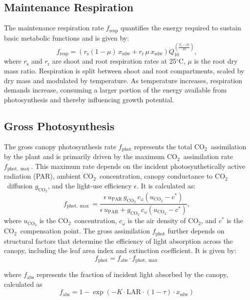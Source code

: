 \documentclass[conference]{IEEEtran}
\newcommand{\ui}[2]{#1_{\mathrm{#2}}}
\newcommand{\coo}{\ensuremath{\mathrm{CO_2}}}
\begin{document}
\subsection{Maintenance Respiration} The maintenance respiration rate \( \ui{f}{resp} \) quantifies the energy required to sustain basic metabolic functions and is given by:
\begin{equation}
    \ui{f}{resp} = \left( \ui{r}{s} (1 - \mu)\, \ui{x}{sdw} + \ui{r}{r}\, \mu \, \ui{x}{sdw} \right) Q_{10}^{\left( \frac{\ui{T}{i} - 25}{10} \right)},
\end{equation}
where \( \ui{r}{s} \) and \( \ui{r}{r} \) are shoot and root respiration rates at 25\( ^\circ \)C, \( \mu \) is the root dry mass ratio. Respiration is split between shoot and root compartments, scaled by dry mass and modulated by temperature. As temperature increases, respiration demands increase, consuming a larger portion of the energy available from photosynthesis and thereby influencing growth potential.

\subsection{Gross Photosynthesis} The gross canopy photosynthesis rate \( \ui{f}{phot} \) represents the total \coo\ assimilation by the plant and is primarily driven by the maximum \coo\ assimilation rate \( \ui{f}{phot,\max} \). This maximum rate depends on the incident photosynthetically active radiation (PAR), ambient \coo\ concentration, canopy conductance to \coo\ diffusion \( \ui{g}{\coo} \), and the light-use efficiency \( \epsilon \). It is calculated as:
\begin{equation}
    \ui{f}{phot,\max} = \frac{\epsilon \, \ui{u}{PAR}\, \ui{g}{\coo}\, \ui{c}{\omega} (\ui{u}{\coo} - c^*)}{\epsilon \, \ui{u}{PAR} + \ui{g}{\coo}\, \ui{c}{\omega} (\ui{u}{\coo} - c^*)},
\end{equation}
where \( \ui{u}{\coo} \) is the \coo\ concentration, \( \ui{c}{\omega} \) is the air density of \coo, and \( c^* \) is the \coo\ compensation point. The gross assimilation \( \ui{f}{phot} \) further depends on structural factors that determine the efficiency of light absorption across the canopy, including the leaf area index and extinction coefficient. It is given by:
\begin{equation}
    \ui{f}{phot} = \ui{f}{abs} \cdot \ui{f}{phot,\max}
\end{equation}

where \( \ui{f}{abs} \) represents the fraction of incident light absorbed by the canopy, calculated as
\begin{equation}
    \ui{f}{abs} = 1 - \exp(-K \cdot \mathrm{LAR} \cdot (1-\tau) \cdot \ui{x}{sdw})
\end{equation}
\end{document}
